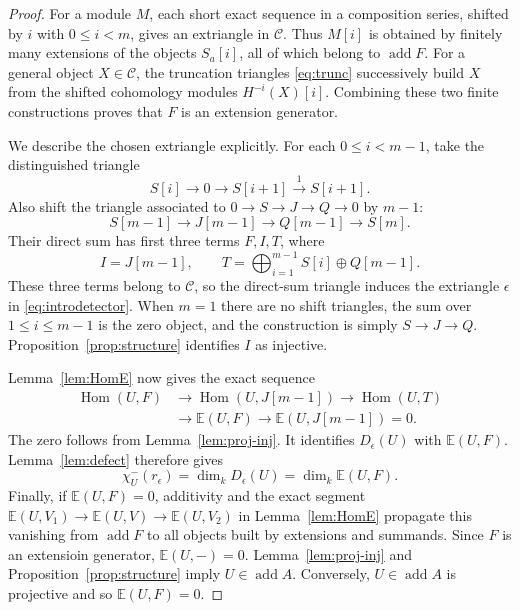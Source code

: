 \documentclass[pdflatex,sn-mathphys-num]{sn-jnl}
\numberwithin{equation}{section}
\theoremstyle{definition}
\theoremstyle{remark}\newtheorem{remark}[theorem]{Remark}
\newcommand{\C}{\mathcal C}
\newcommand{\E}{\mathbb E}
\newcommand{\Hom}{\operatorname{Hom}}
\newcommand{\add}{\operatorname{add}}
\newcommand{\dimk}{\dim_k}
\begin{document}
\begin{proof}
For a module $M$, each short exact sequence in a composition series,
shifted by $i$ with $0\leq i<m$, gives an extriangle in $\C$.
Thus $M[i]$ is obtained by finitely many extensions of the objects
$S_a[i]$, all of which belong to $\add F$. For a general object
$X\in\C$, the truncation triangles \eqref{eq:trunc} successively
build $X$ from the shifted cohomology modules $H^{-i}(X)[i]$.
Combining these two finite constructions proves that $F$ is an
extension generator.

We describe the chosen extriangle explicitly. For each
$0\leq i<m-1$, take the distinguished triangle
\[
 S[i]\longrightarrow0\longrightarrow S[i+1]
       \xrightarrow{1}S[i+1].
\]
Also shift the triangle associated to
$0\to S\to J\to Q\to0$ by $m-1$:
\[
 S[m-1]\longrightarrow J[m-1]\longrightarrow Q[m-1]
           \longrightarrow S[m].
\]
Their direct sum has first three terms $F,I,T$, where
\begin{equation}\label{eq:fixedtriangle}
 I=J[m-1],\qquad T=\bigoplus_{i=1}^{m-1}S[i]\oplus Q[m-1].
\end{equation}
These three terms belong to $\C$, so the direct-sum triangle induces
the extriangle $\epsilon$ in \eqref{eq:introdetector}. When $m=1$
there are no shift triangles, the sum over $1\leq i\leq m-1$ is
the zero object, and the construction is simply $S\to J\to Q$.
Proposition~\ref{prop:structure} identifies $I$ as injective.

Lemma~\ref{lem:HomE} now gives the exact sequence
\[
\begin{aligned}
 \Hom(U,F)&\longrightarrow\Hom(U,J[m-1])\longrightarrow\Hom(U,T)\\
 &\longrightarrow\E(U,F)\longrightarrow\E(U,J[m-1])=0.
\end{aligned}
\]
The zero follows from Lemma~\ref{lem:proj-inj}. It identifies
$D_\epsilon(U)$ with $\E(U,F)$. Lemma~\ref{lem:defect} therefore gives
\[
 \chi^-_U(r_\epsilon)=\dimk D_\epsilon(U)=\dimk\E(U,F).
\]
Finally, if $\E(U,F)=0$, additivity and the exact segment
$\E(U,V_1)\to\E(U,V)\to\E(U,V_2)$ in Lemma~\ref{lem:HomE}
propagate this vanishing from $\add F$ to all objects built by
extensions and summands. Since $F$ is an extensioin generator, $\E(U,-)=0$.
Lemma~\ref{lem:proj-inj} and Proposition~\ref{prop:structure} imply
$U\in\add A$. Conversely, $U\in\add A$ is projective and so
$\E(U,F)=0$.
\end{proof}
\end{document}
